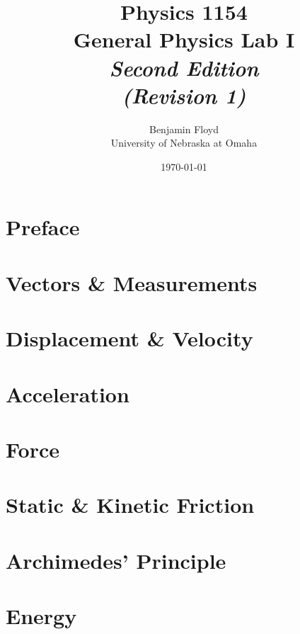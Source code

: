 \documentclass{book}
\title{Physics 1154\\
General Physics Lab I\\
{\Large\emph{Second Edition}}\\
{\large\emph{(Revision 1)}}}
\author{Benjamin Floyd\\
University of Nebraska at Omaha}
\date{\today}
\theoremstyle{definition}
\begin{document}
\frontmatter

\maketitle

\tableofcontents

\chapter{Preface}


\mainmatter

\chapter{Vectors \& Measurements} \label{chap:Vectors-Measurements}


\chapter{Displacement \& Velocity} \label{chap:Disp-Vel}
\setcounter{question}{0}


\chapter{Acceleration} \label{chap:Acceleration}
\setcounter{question}{0}


\chapter{Force} \label{chap:Force}
\setcounter{question}{0}


\chapter{Static \& Kinetic Friction} \label{chap:Friction}
\setcounter{question}{0}


\chapter{Archimedes' Principle} \label{chap:Archimedes}
\setcounter{question}{0}


\chapter{Energy} \label{chap:Energy}
\setcounter{question}{0}

\end{document}
